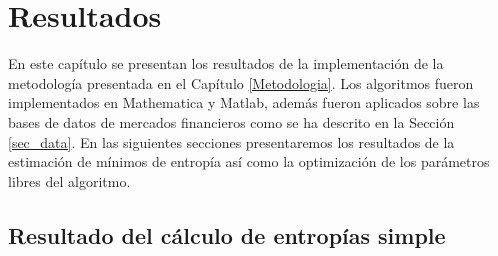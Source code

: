 %
\chapter{Resultados}
\label{Resultados}

En este capítulo se presentan los resultados de la implementación de la metodología presentada en el Capítulo \ref{Metodologia}. 
Los algoritmos fueron implementados en Mathematica y Matlab, además fueron aplicados sobre las bases de datos de mercados financieros como se ha descrito en la Sección \ref{sec_data}.
En las siguientes secciones presentaremos los resultados de la estimación de mínimos de entropía así como la optimización de los parámetros libres del algoritmo.


\section{Resultado del cálculo de entropías simple}
